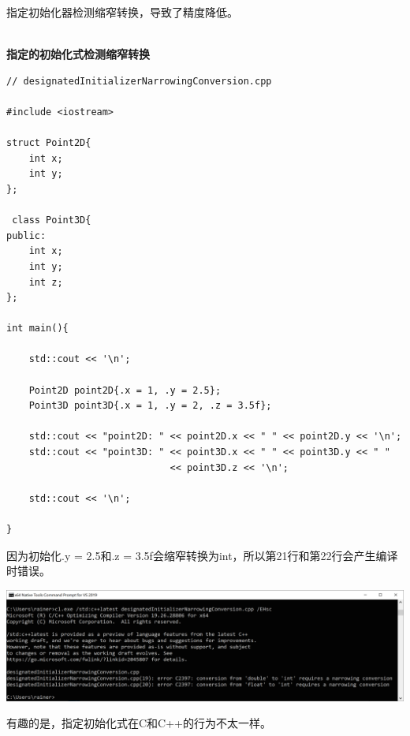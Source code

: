 指定初始化器检测缩窄转换，导致了精度降低。

\hspace*{\fill} \\ %
\noindent
\textbf{指定的初始化式检测缩窄转换}
\begin{lstlisting}[style=styleCXX]
// designatedInitializerNarrowingConversion.cpp

#include <iostream>

struct Point2D{
	int x;
	int y;
};

 class Point3D{
public:
	int x;
	int y;
	int z;
};

int main(){
	
	std::cout << '\n';
	
	Point2D point2D{.x = 1, .y = 2.5};
	Point3D point3D{.x = 1, .y = 2, .z = 3.5f};
	
	std::cout << "point2D: " << point2D.x << " " << point2D.y << '\n';
	std::cout << "point3D: " << point3D.x << " " << point3D.y << " "
							 << point3D.z << '\n';
	
	std::cout << '\n';

}
\end{lstlisting}

因为初始化.y = 2.5和.z = 3.5f会缩窄转换为int，所以第21行和第22行会产生编译时错误。

\begin{center}
\includegraphics[width=1.0\textwidth]{content/3/chapter4/images/35.png}\\
\end{center}

有趣的是，指定初始化式在C和C++的行为不太一样。

